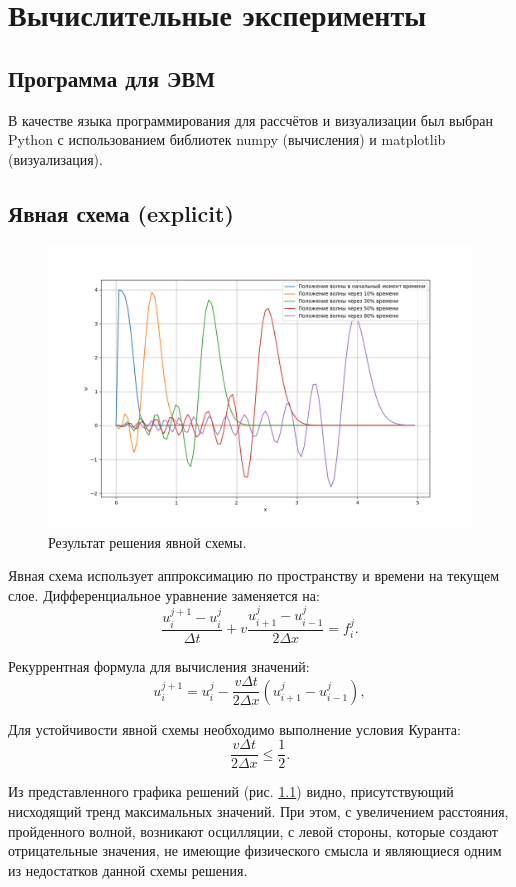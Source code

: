 \chapter{Вычислительные эксперименты}
\section{Программа для ЭВМ}
В качестве языка программирования для рассчётов и
визуализации был выбран Python с использованием библиотек numpy
(вычисления) и matplotlib (визуализация).
\section{Явная схема (explicit)}
\begin{figure}[h]  %
	\centering
	\includegraphics[height=0.7\textwidth]{imgs/explicit.png}  %
	\caption{Результат решения явной схемы.}  %
	\label{fig:explicit}  %
\end{figure}


Явная схема использует аппроксимацию по пространству и времени на текущем слое. Дифференциальное уравнение заменяется на:
$$
	\frac{u_i^{j+1} - u_i^j}{\Delta t} + v \frac{u_{i+1}^j - u_{i-1}^j}{2\Delta x} = f_{i}^{j}.
$$

Рекуррентная формула для вычисления значений:
$$
 u_i^{j+1} = u_i^j - \frac{v \Delta t}{2 \Delta x} \left( u_{i+1}^j - u_{i-1}^j \right),
$$

Для устойчивости явной схемы необходимо выполнение условия Куранта\cite{Turchak2003}:
\begin{equation}
	\boxed{\frac{v \Delta t}{2\Delta x} \leq \frac{1}{2}}.
	\label{eq:ust1}
\end{equation}
\newline
 
Из представленного графика решений (рис. \ref{fig:explicit}) видно, присутствующий нисходящий тренд максимальных значений. При этом, с увеличением расстояния, пройденного волной, возникают осцилляции, с левой стороны, которые создают отрицательные значения, не имеющие физического смысла  и являющиеся одним из недостатков данной схемы решения.

